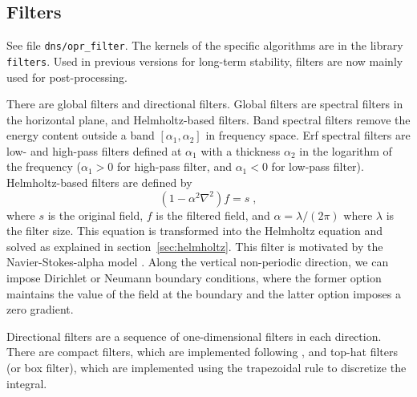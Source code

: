 \subsection{Filters}\label{sec:filters}

See file {\tt dns/opr\_filter}. The kernels of the specific algorithms are in the library {\tt filters}. Used in previous versions for long-term stability, filters are now mainly used for post-processing.

There are global filters and directional filters. Global filters are spectral filters in the horizontal plane, and Helmholtz-based filters. Band spectral filters remove the energy content outside a band $[\alpha_1,\alpha_2]$ in frequency space. Erf spectral filters are low- and high-pass filters defined at $\alpha_1$ with a thickness $\alpha_2$ in the logarithm of the frequency ($\alpha_1>0$ for high-pass filter, and $\alpha_1<0$ for low-pass filter). Helmholtz-based filters are defined by
\begin{equation}
  (1-\alpha^2\nabla^2) f = s \;,
\end{equation}
where $s$ is the original field, $f$ is the filtered field, and $\alpha=\lambda/(2\pi)$ where $\lambda$ is the filter size. This equation is transformed into the Helmholtz equation and solved as explained in section~\ref{sec:helmholtz}. This filter is motivated by the Navier-Stokes-alpha model \citep{Foias:2001}. Along the vertical non-periodic direction, we can impose Dirichlet or Neumann boundary conditions, where the former option maintains the value of the field at the boundary and the latter option imposes a zero gradient.

Directional filters are a sequence of one-dimensional filters in each direction. There are compact filters, which are implemented following \cite{Lele:1992}, and top-hat filters (or box filter), which are implemented using the trapezoidal rule to discretize the integral.

